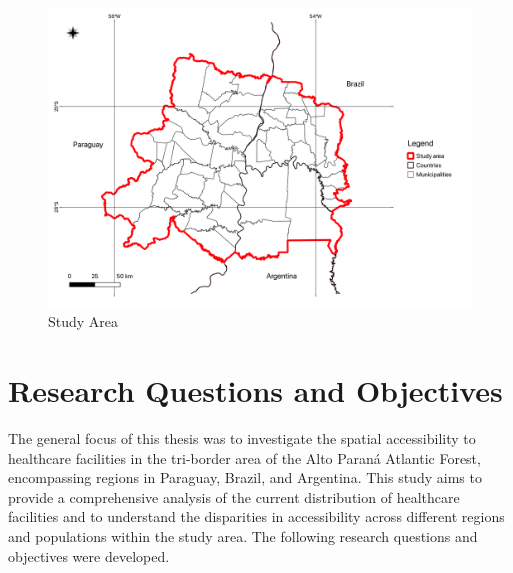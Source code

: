 \documentclass[11pt, a4paper]{report}
\begin{document}
\begin{figure}[H]
  \centering
  \includegraphics[width=0.9\linewidth]{figures/Study Area.png}
  \caption{Study Area}
  \label{fig:studyarea}
\end{figure}

\newpage
\section{Research Questions and Objectives}
The general focus of this thesis was to investigate the spatial accessibility to healthcare facilities in the tri-border area of the Alto Paraná Atlantic Forest, encompassing regions in Paraguay, Brazil, and Argentina. This study aims to provide a comprehensive analysis of the current distribution of healthcare facilities and to understand the disparities in accessibility across different regions and populations within the study area. The following research questions and objectives were developed.
\end{document}
